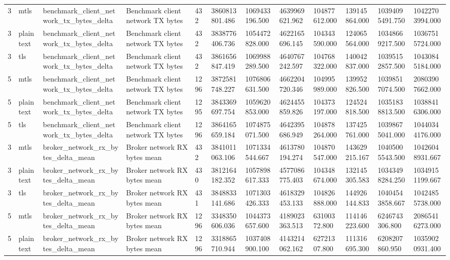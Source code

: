 \begin{longtable}{llllllllllll}
3 & mtls & benchmark\_client\_network\_tx\_bytes\_delta & Benchmark client network TX bytes & 432 & 3860813801.486 & 1069433196.500 & 4639969621.962 & 104877612.000 & 139145864.000 & 10394095491.750 & 10422703994.000 \\
3 & plaintext & benchmark\_client\_network\_tx\_bytes\_delta & Benchmark client network TX bytes & 432 & 3838776406.736 & 1054472828.000 & 4622165696.145 & 104343590.000 & 124065564.000 & 10348669217.500 & 10367515724.000 \\
3 & tls & benchmark\_client\_network\_tx\_bytes\_delta & Benchmark client network TX bytes & 432 & 3861656847.419 & 1069988289.500 & 4640767242.597 & 104768322.000 & 140042837.000 & 10395152857.500 & 10430845184.000 \\
5 & mtls & benchmark\_client\_network\_tx\_bytes\_delta & Benchmark client network TX bytes & 1296 & 3872581748.227 & 1076806631.500 & 4662204720.346 & 104995989.000 & 139952826.500 & 10398517074.500 & 20803907662.000 \\
5 & plaintext & benchmark\_client\_network\_tx\_bytes\_delta & Benchmark client network TX bytes & 1295 & 3843369697.754 & 1059620853.000 & 4624455859.826 & 104373197.000 & 124524818.500 & 10351838813.500 & 10388416306.000 \\
5 & tls & benchmark\_client\_network\_tx\_bytes\_delta & Benchmark client network TX bytes & 1296 & 3864165659.184 & 1074875071.500 & 4642395686.949 & 104878264.000 & 137425761.000 & 10398675041.000 & 10440344176.000 \\
3 & mtls & broker\_network\_rx\_bytes\_delta\_mean & Broker network RX bytes mean & 432 & 3841011063.106 & 1071334544.667 & 4613780194.274 & 104870547.000 & 143629215.167 & 10405005543.500 & 10426048931.667 \\
3 & plaintext & broker\_network\_rx\_bytes\_delta\_mean & Broker network RX bytes mean & 430 & 3812164182.352 & 1057898617.333 & 4577086775.403 & 104348674.000 & 132145305.583 & 10343498284.250 & 10349151199.667 \\
3 & tls & broker\_network\_rx\_bytes\_delta\_mean & Broker network RX bytes mean & 431 & 3848833141.686 & 1071303426.333 & 4618329453.133 & 104826888.000 & 144926144.833 & 10404543858.667 & 10424855738.000 \\
5 & mtls & broker\_network\_rx\_bytes\_delta\_mean & Broker network RX bytes mean & 1296 & 3348350606.036 & 1044373657.600 & 4189023363.513 & 63100372.800 & 114146223.600 & 6246743306.800 & 20865416273.000 \\
5 & plaintext & broker\_network\_rx\_bytes\_delta\_mean & Broker network RX bytes mean & 1296 & 3318865710.944 & 1037408900.100 & 4143214062.162 & 62721307.800 & 111316695.300 & 6208207860.950 & 10359020931.400 \\

\end{longtable}
